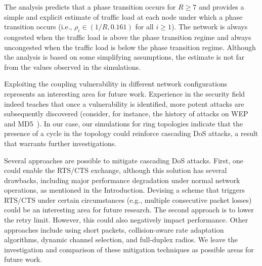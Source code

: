 \documentclass{IEEEtran}
\begin{document}
The analysis predicts that a phase transition occurs for $R \geq 7$ and provides a simple and explicit estimate of traffic load at each node under
which a phase transition occurs  (i.e., $\rho_i \in (1/R, 0.161)$ for all $i \geq  1$). The network is always congested when the traffic load is
above the phase transition regime and always uncongested when the traffic load is below the phase transition regime. Although the analysis is based
on some simplifying assumptions, the estimate is not far from the values observed in the simulations.



Exploiting the coupling vulnerability in different network configurations represents an interesting area for future work.
Experience in the security field indeed teaches that once a vulnerability is identified, more  potent attacks are subsequently discovered
(consider,
for instance, the history of attacks on WEP~\cite{tews2007breaking} and MD5~\cite{black2006study}). In our case, our simulations for ring topologies
indicate that the presence of a cycle in the topology could reinforce cascading DoS attacks, a result that warrants further investigations.

Several approaches are possible to mitigate cascading DoS attacks. First, one could enable the RTS/CTS exchange, although this solution has several
drawbacks, including major performance degradation under normal network operations, as mentioned in the Introduction. Devising a scheme that triggers RTS/CTS under certain circumstances (e.g., multiple consecutive packet losses) could be an interesting area for future research.
The second approach is to
lower the retry limit. However, this could also negatively impact performance. Other approaches include using short packets, collision-aware rate
adaptation algorithms, dynamic channel selection, and full-duplex radios. We leave the investigation and comparison of these
mitigation techniques as possible areas for future work.










\end{document}
